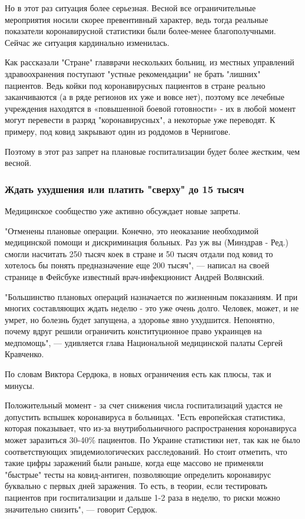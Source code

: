 Но в этот раз ситуация более серьезная. Весной все ограничительные мероприятия
носили скорее превентивный характер, ведь тогда реальные показатели
коронавирусной статистики были более-менее благополучными. Сейчас же ситуация
кардинально изменилась.

Как рассказали "Стране" главврачи нескольких больниц, из местных управлений
здравоохранения поступают "устные рекомендации" не брать "лишних" пациентов.
Ведь койки под коронавирусных пациентов в стране реально заканчиваются (а в
ряде регионов их уже и вовсе нет), поэтому все лечебные учреждения находятся в
«повышенной боевой готовности» - их в любой момент могут перевести в разряд
"коронавирусных", а некоторые уже переводят. К примеру, под ковид закрывают
один из роддомов в Чернигове.

Поэтому в этот раз запрет на плановые госпитализации будет более жестким, чем
весной.

\subsubsection{Ждать ухудшения или платить "сверху" до 15 тысяч}

Медицинское сообщество уже активно обсуждает новые запреты.

"Отменены плановые операции. Конечно, это неоказание необходимой медицинской
помощи и дискриминация больных. Раз уж вы (Минздрав - Ред.) смогли насчитать
250 тысяч коек в стране и 50 тысяч отдали под ковид то хотелось бы понять
предназначение еще 200 тысяч", — написал на своей странице в Фейсбуке известный
врач-инфекционист Андрей Волянский.

"Большинство плановых операций назначается по жизненным показаниям. И при
многих составляющих ждать неделю - это уже очень долго. Человек, может, и не
умрет, но болезнь будет запущена, а здоровье явно ухудшится. Непонятно, почему
вдруг решили ограничить конституционное право украинцев на медпомощь", —
удивляется глава Национальной медицинской палаты Сергей Кравченко. 

По словам Виктора Сердюка, в новых ограничения есть как плюсы, так и минусы.

Положительный момент - за счет снижения числа госпитализаций удастся не
допустить вспышек коронавируса в больницах. "Есть европейская статистика,
которая показывает, что из-за внутрибольничного распространения коронавируса
может заразиться 30-40\% пациентов. По Украине статистики нет, так как не было
соответствующих эпидемиологических расследований. Но стоит отметить, что такие
цифры заражений были раньше, когда еще массово не применяли "быстрые" тесты на
ковид-антиген, позволяющие определить коронавирус буквально с первых дней
заражения. То есть, в теории, если тестировать пациентов при госпитализации и
дальше 1-2 раза в неделю, то риски можно значительно снизить", — говорит
Сердюк.

